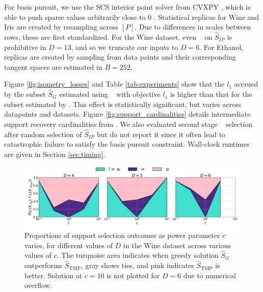 For basis pursuit, we use the SCS interior point solver \citep{ocpb:16} from CVXPY \citep{diamond2016cvxpy, agrawal2018rewriting}, which is able to push sparse values arbitrarily close to 0 \citep{cvxpy_sparse_solution}.
Statistical replicas for Wine and Iris are created by resampling across $[P]$.
Due to differences in scales between rows, these are first standardized.
For the Wine dataset, even \brute~ on $\widehat {S}_{IP}$ is prohibitive in $D=13$, and so we truncate our inputs to $D=6$.
For Ethanol, replicas are created by sampling from data points and their corresponding tangent spaces are estimated in $B = 252$.

Figure \ref{fig:isometry_losses} and Table \ref{tab:experiments} show that the $l_1$ accrued by the subset $\widehat S_{G}$ estimated using \greedy~ with objective $l_1$ is higher than that for the subset estimated by \tsip.
This effect is statistically significant, but varies across datapoints and datasets.
Figure \ref{fig:support_cardinalities} details intermediate support recovery cardinalities from \isometrypursuit.
We also evaluated second stage \brute~ selection after random selection of $\widehat S_{IP}$ but do not report it since it often lead to catastrophic failure to satisfy the basis pursuit constraint.
Wall-clock runtimes are given in Section \ref{sec:timing}.




\begin{figure}[t]
    \centering
    \includegraphics[width=\textwidth]{../figures/grid_power_comparison_filled.png}
    \caption{
        Proportions of support selection outcomes as power parameter $c$ varies, for different values of $D$ in the Wine dataset across various values of $c$.
        The turquoise area indicates when greedy solution  $\widehat{S}_G$ outperforms $\widehat{S}_{\text{TSIP}}$, gray shows ties, and pink indicates $\widehat{S}_{\text{TSIP}}$ is better.
        Solution at $c=10$ is not plotted for $D=6$ due to numerical overflow.
    }
    \label{fig:stacked_power_comparison}
\end{figure}



